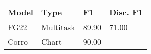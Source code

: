 \documentclass{report}
\theoremstyle{definition}
\theoremstyle{plain}
\theoremstyle{definition}
\theoremstyle{remark}
\numberwithin{equation}{section}
\numberwithin{figure}{section}
\numberwithin{table}{section}
\begin{document}
\begin{table}[H]\centering
	\begin{tabular}[t]{@{}
			>{\arraybackslash}p{}
			>{\arraybackslash}p{}
			>{\arraybackslash}p{}
			>{\arraybackslash}p{}		
@{}}\toprule\begin{minipage}[t]{\linewidth}\raggedright

		Model
		\end{minipage} & \begin{minipage}[t]{\linewidth}\raggedright

		Type
		\end{minipage} & \begin{minipage}[t]{\linewidth}\raggedright

		F1
		\end{minipage} & \begin{minipage}[t]{\linewidth}\raggedright

		Disc. F1
		\end{minipage}\\\midrule\begin{minipage}[t]{\linewidth}\raggedright

		FG22
		\end{minipage} & \begin{minipage}[t]{\linewidth}\raggedright

		Multitask
		\end{minipage} & \begin{minipage}[t]{\linewidth}\raggedright

		89.90
		\end{minipage} & \begin{minipage}[t]{\linewidth}\raggedright

		71.00
		\end{minipage}\\\midrule\begin{minipage}[t]{\linewidth}\raggedright

		Corro
		\end{minipage} & \begin{minipage}[t]{\linewidth}\raggedright

		Chart
		\end{minipage} & \begin{minipage}[t]{\linewidth}\raggedright

		90.00
		\end{minipage} & \begin{minipage}[t]{\linewidth}\raggedright


\end{minipage}
\end{tabular}
\end{table}
\end{document}
